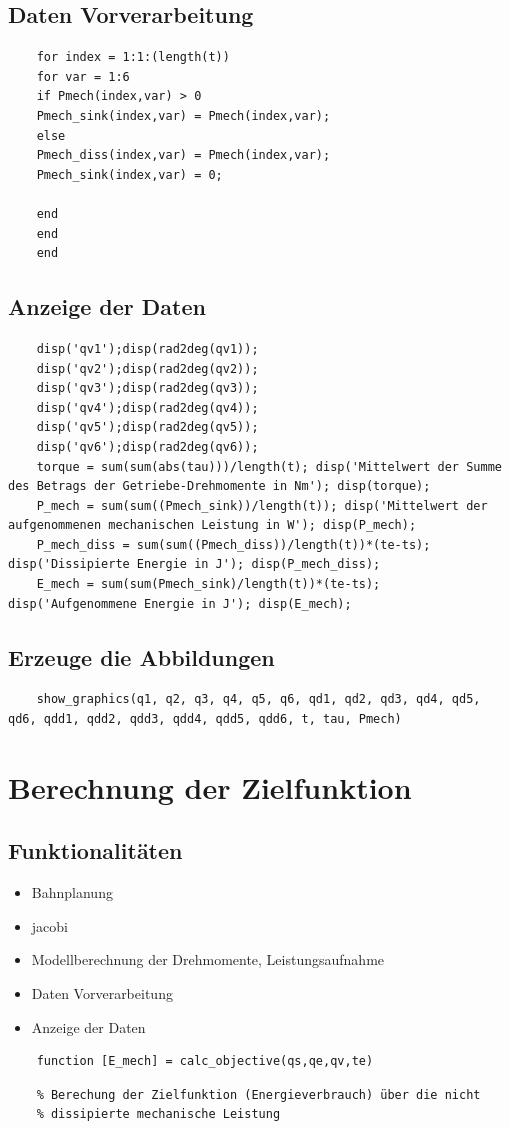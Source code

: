 \subsection*{Daten Vorverarbeitung}
%
\begin{lstlisting}
	for index = 1:1:(length(t))
	for var = 1:6
	if Pmech(index,var) > 0
	Pmech_sink(index,var) = Pmech(index,var);
	else
	Pmech_diss(index,var) = Pmech(index,var);
	Pmech_sink(index,var) = 0;
	
	end
	end
	end
\end{lstlisting}
%
\subsection*{Anzeige der Daten}
%
\begin{lstlisting}
	disp('qv1');disp(rad2deg(qv1));
	disp('qv2');disp(rad2deg(qv2));
	disp('qv3');disp(rad2deg(qv3));
	disp('qv4');disp(rad2deg(qv4));
	disp('qv5');disp(rad2deg(qv5));
	disp('qv6');disp(rad2deg(qv6));
	torque = sum(sum(abs(tau)))/length(t); disp('Mittelwert der Summe des Betrags der Getriebe-Drehmomente in Nm'); disp(torque);
	P_mech = sum(sum((Pmech_sink))/length(t)); disp('Mittelwert der aufgenommenen mechanischen Leistung in W'); disp(P_mech);
	P_mech_diss = sum(sum((Pmech_diss))/length(t))*(te-ts); disp('Dissipierte Energie in J'); disp(P_mech_diss);
	E_mech = sum(sum(Pmech_sink)/length(t))*(te-ts); disp('Aufgenommene Energie in J'); disp(E_mech);
\end{lstlisting}
%
\subsection*{Erzeuge die Abbildungen}
%
\begin{lstlisting}
	show_graphics(q1, q2, q3, q4, q5, q6, qd1, qd2, qd3, qd4, qd5, qd6, qdd1, qdd2, qdd3, qdd4, qdd5, qdd6, t, tau, Pmech)
\end{lstlisting}
%
%
\section{Berechnung der Zielfunktion}
%
\label{add:zielfunktion}
\subsection*{Funktionalitäten}
%
\begin{itemize}
	\setlength{\itemsep}{-1ex}
	\item Bahnplanung
	\item jacobi
	\item Modellberechnung der Drehmomente, Leistungsaufnahme
	\item Daten Vorverarbeitung
	\item Anzeige der Daten
\end{itemize}
\begin{lstlisting}
	function [E_mech] = calc_objective(qs,qe,qv,te)
\end{lstlisting}
\begin{lstlisting}
	% Berechung der Zielfunktion (Energieverbrauch) über die nicht
	% dissipierte mechanische Leistung
\end{lstlisting}
%
